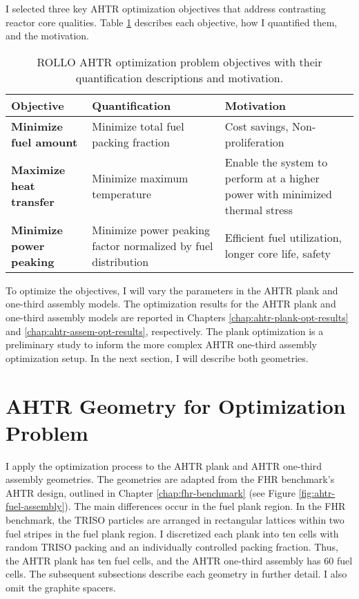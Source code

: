 I selected three key \gls{AHTR} optimization objectives that address contrasting reactor 
core qualities. 
Table \ref{tab:objectives} describes each objective, how I quantified them, and the motivation.
\begin{table}[htbp]
    \centering
    \onehalfspacing
    \caption{\acrfull{ROLLO} \acrfull{AHTR} optimization problem objectives with 
    their quantification descriptions and motivation.}
	\label{tab:objectives}
    \footnotesize
    \begin{tabular}{p{4.5cm}|p{5cm}p{5cm}}
    \hline 
    \textbf{Objective}& \textbf{Quantification}& \textbf{Motivation} \\
    \hline
    \textbf{Minimize fuel amount} & Minimize total fuel packing fraction 
    & Cost savings, Non-proliferation \\ 
    \hline
    \textbf{Maximize heat transfer} & Minimize maximum temperature 
    & Enable the system to perform at a higher power with minimized thermal stress \\
    \hline
    \textbf{Minimize power peaking} & Minimize power peaking factor normalized by fuel distribution 
    & Efficient fuel utilization, longer core life, safety\\
    \hline
    \end{tabular}
\end{table}

To optimize the objectives, I will vary the parameters in the \gls{AHTR} plank and 
one-third assembly models. 
The optimization results for the \gls{AHTR} plank and one-third assembly models are 
reported in Chapters \ref{chap:ahtr-plank-opt-results} and \ref{chap:ahtr-assem-opt-results}, 
respectively. 
The plank optimization is a preliminary study to inform the more complex \gls{AHTR} 
one-third assembly optimization setup. 
In the next section, I will describe both geometries. 

\section{AHTR Geometry for Optimization Problem}
I apply the optimization process to the \gls{AHTR} plank and \gls{AHTR} one-third
assembly geometries.
The geometries are adapted from the \gls{FHR} benchmark's \gls{AHTR} design,
outlined in Chapter \ref{chap:fhr-benchmark} (see Figure \ref{fig:ahtr-fuel-assembly}).
The main differences occur in the fuel plank region. 
In the \gls{FHR} benchmark, the TRISO particles are arranged in rectangular lattices within
two fuel stripes in the fuel plank region. 
I discretized each plank into ten cells with random TRISO packing and an individually 
controlled packing fraction. 
Thus, the \gls{AHTR} plank has ten fuel cells, and the \gls{AHTR} one-third assembly 
has 60 fuel cells.  
The subsequent subsections describe each geometry in further detail.
I also omit the graphite spacers. 


